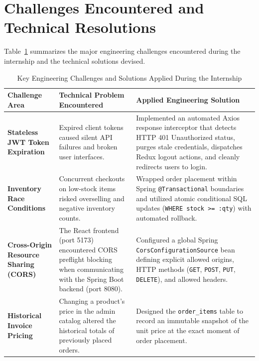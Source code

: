 \section{Challenges Encountered and Technical Resolutions}
Table~\ref{tab:challenges} summarizes the major engineering challenges encountered during the internship and the technical solutions devised.

\begin{table}[H]
\centering
\fontsize{10.5}{14}\selectfont
\begin{tabularx}{\textwidth}{|p{3.2cm}|X|X|}
\hline
\textbf{Challenge Area} & \textbf{Technical Problem Encountered} & \textbf{Applied Engineering Solution} \\
\hline
\textbf{Stateless JWT Token Expiration} & 
Expired client tokens caused silent API failures and broken user interfaces. & 
Implemented an automated Axios response interceptor that detects HTTP 401 Unauthorized status, purges stale credentials, dispatches Redux logout actions, and cleanly redirects users to login. \\
\hline
\textbf{Inventory Race Conditions} & 
Concurrent checkouts on low-stock items risked overselling and negative inventory counts. & 
Wrapped order placement within Spring \texttt{@Transactional} boundaries and utilized atomic conditional SQL updates (\texttt{WHERE stock >= :qty}) with automated rollback. \\
\hline
\textbf{Cross-Origin Resource Sharing (CORS)} & 
The React frontend (port 5173) encountered CORS preflight blocking when communicating with the Spring Boot backend (port 8080). & 
Configured a global Spring \texttt{CorsConfigurationSource} bean defining explicit allowed origins, HTTP methods (\texttt{GET}, \texttt{POST}, \texttt{PUT}, \texttt{DELETE}), and allowed headers. \\
\hline
\textbf{Historical Invoice Pricing} & 
Changing a product's price in the admin catalog altered the historical totals of previously placed orders. & 
Designed the \texttt{order\_items} table to record an immutable snapshot of the unit price at the exact moment of order placement. \\
\hline
\end{tabularx}
\caption{Key Engineering Challenges and Solutions Applied During the Internship}
\label{tab:challenges}
\end{table}
